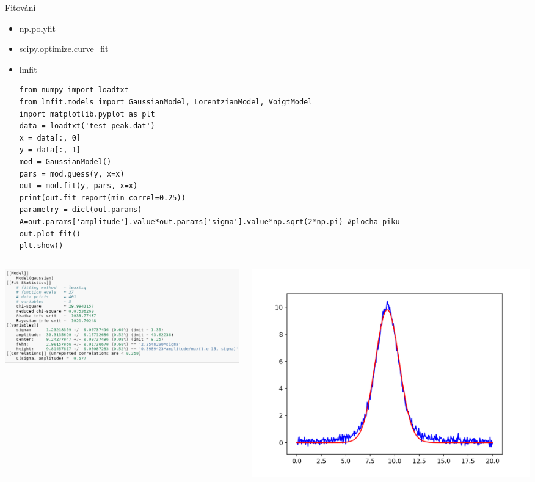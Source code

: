 \documentclass[10pt]{beamer}
\begin{document}
\begin{frame}[fragile]{Fitování}
    \begin{itemize}
        \item np.polyfit
        \item scipy.optimize.curve\_fit
        \item lmfit
            \begin{lstlisting}[columns=flexible]
from numpy import loadtxt
from lmfit.models import GaussianModel, LorentzianModel, VoigtModel
import matplotlib.pyplot as plt
data = loadtxt('test_peak.dat')
x = data[:, 0]
y = data[:, 1]
mod = GaussianModel()
pars = mod.guess(y, x=x)
out = mod.fit(y, pars, x=x)
print(out.fit_report(min_correl=0.25))
parametry = dict(out.params)
A=out.params['amplitude'].value*out.params['sigma'].value*np.sqrt(2*np.pi) #plocha piku
out.plot_fit()
plt.show()
\end{lstlisting}
\vspace{-0.8cm}
\end{itemize}
\begin{columns}
    \centering
    \begin{column}{.65\textwidth}
        \includegraphics[width=\textwidth]{lmfit.png}
    \end{column}
    \begin{column}{.35\textwidth}
        \includegraphics[width=\textwidth]{peak.png}
    \end{column}
\end{columns}
\end{frame}
\end{document}
